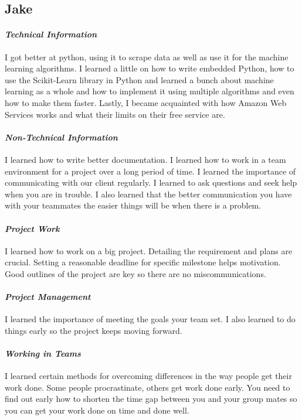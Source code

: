 \documentclass[onecolumn, draftclsnofoot,10pt, compsoc]{IEEEtran}
\begin{document}
\subsection{Jake}
\paragraph{\emph{Technical Information}}

I got better at python, using it to scrape data as well as use it for the machine learning algorithms. I learned a little on how to write embedded Python, how to use the Scikit-Learn library in Python and learned a bunch about machine learning as a whole and how to implement it using multiple algorithms and even how to make them faster. Lastly, I became acquainted with how Amazon Web Services works and what their limits on their free service are. 


\paragraph{\emph{Non-Technical Information}}
I learned how to write better documentation. I learned how to work in a team environment for a project over a long period of time. I learned the importance of communicating with our client regularly. I learned to ask questions and seek help when you are in trouble. I also learned that the better communication you have with your teammates the easier things will be when there is a problem.

\paragraph{\emph{Project Work}}
I learned how to work on a big project. Detailing the requirement and plans are crucial. Setting a reasonable deadline for specific milestone helps motivation. Good outlines of the project are key so there are no miscommunications.

\paragraph{\emph{Project Management}}
I learned the importance of meeting the goals your team set. I also learned to do things early so the project keeps moving forward.

\paragraph{\emph{Working in Teams}}
I learned certain methods for overcoming differences in the way people get their work done. Some people procrastinate, others get work done early. You need to find out early how to shorten the time gap between you and your group mates so you can get your work done on time and done well.
\end{document}
